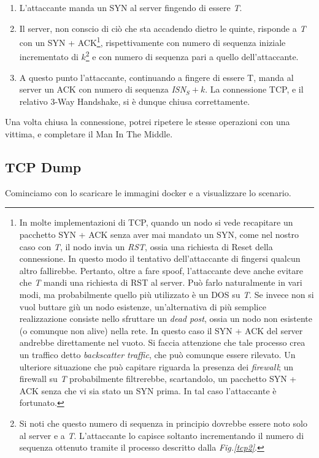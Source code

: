 \documentclass[14pt]{extreport}
\begin{document}
\begin{enumerate}
    \item L'attaccante manda un SYN al server fingendo di essere \textit{T}.
    \item Il server, non conscio di ciò che sta accadendo dietro le quinte, risponde a \textit{T} con un SYN + ACK\footnote{In molte implementazioni di TCP, quando un nodo si vede recapitare un pacchetto SYN + ACK senza aver mai mandato un SYN, come nel nostro caso con \textit{T}, il nodo invia un \textit{RST}, ossia una richiesta di Reset della connessione. In questo modo il tentativo dell'attaccante di fingersi qualcun altro fallirebbe. Pertanto, oltre a fare spoof, l'attaccante deve anche evitare che \textit{T} mandi una richiesta di RST al server. Può farlo naturalmente in vari modi, ma probabilmente quello più utilizzato è un DOS su \textit{T}. Se invece non si vuol buttare giù un nodo esistenze, un'alternativa di più semplice realizzazione consiste nello sfruttare un \textit{dead post}, ossia un nodo non esistente (o comunque non alive) nella rete. In questo caso il SYN + ACK del server andrebbe direttamente nel vuoto. Si faccia attenzione che tale processo crea un traffico detto \textit{backscatter traffic}, che può comunque essere rilevato. Un ulteriore situazione che può capitare riguarda la presenza dei \textit{firewall}; un firewall su \textit{T} probabilmente filtrerebbe, scartandolo, un pacchetto SYN + ACK senza che vi sia stato un SYN prima. In tal caso l'attaccante è fortunato.}, rispettivamente con numero di sequenza iniziale incrementato di $k$\footnote{Si noti che questo numero di sequenza in principio dovrebbe essere noto solo al server e a \textit{T}. L'attaccante lo capisce soltanto incrementando il numero di sequenza ottenuto tramite il processo descritto dalla \textit{Fig.\ref{tcp2}}.} e con numero di sequenza pari a quello dell'attaccante.
    \item A questo punto l'attaccante, continuando a fingere di essere T, manda al server un ACK con numero di sequenza \textit{ISN$_S + k$}. La connessione TCP, e il relativo 3-Way Handshake, si è dunque chiusa correttamente.
\end{enumerate}

Una volta chiusa la connessione, potrei ripetere le stesse operazioni con una vittima, e completare il Man In The Middle.

\subsection{TCP Dump}
Cominciamo con lo scaricare le immagini docker e a visualizzare lo scenario.
\end{document}
